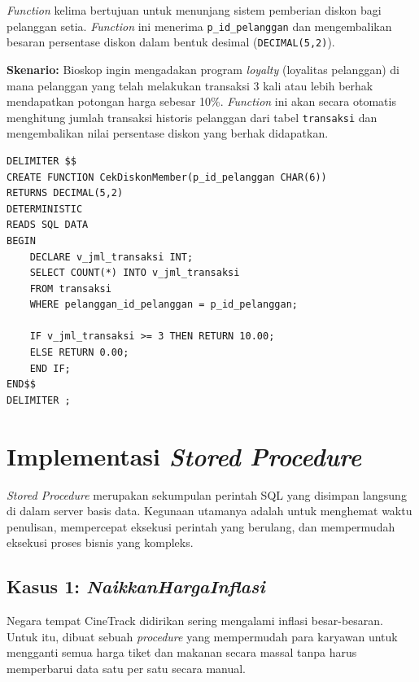 \documentclass[letter,12pt,bahasa]{article}
\begin{document}
\textit{Function} kelima bertujuan untuk menunjang sistem pemberian diskon bagi pelanggan setia. \textit{Function} ini menerima \texttt{p\_id\_pelanggan} dan mengembalikan besaran persentase diskon dalam bentuk desimal (\texttt{DECIMAL(5,2)}).

\textbf{Skenario:} Bioskop ingin mengadakan program \textit{loyalty} (loyalitas pelanggan) di mana pelanggan yang telah melakukan transaksi 3 kali atau lebih berhak mendapatkan potongan harga sebesar 10\%. \textit{Function} ini akan secara otomatis menghitung jumlah transaksi historis pelanggan dari tabel \texttt{transaksi} dan mengembalikan nilai persentase diskon yang berhak didapatkan.

\begin{lstlisting}[style=sql, caption={\textit{Function} 5 --- \texttt{CekDiskonMember}}, label={lst:func5}]
DELIMITER $$
CREATE FUNCTION CekDiskonMember(p_id_pelanggan CHAR(6))
RETURNS DECIMAL(5,2)
DETERMINISTIC
READS SQL DATA
BEGIN
    DECLARE v_jml_transaksi INT;
    SELECT COUNT(*) INTO v_jml_transaksi
    FROM transaksi
    WHERE pelanggan_id_pelanggan = p_id_pelanggan;
    
    IF v_jml_transaksi >= 3 THEN RETURN 10.00;
    ELSE RETURN 0.00;
    END IF;
END$$
DELIMITER ;
\end{lstlisting}

\clearpage

\section{Implementasi \textit{Stored Procedure}}

\textit{Stored Procedure} merupakan sekumpulan perintah SQL yang disimpan langsung di dalam server basis data. Kegunaan utamanya adalah untuk menghemat waktu penulisan, mempercepat eksekusi perintah yang berulang, dan mempermudah eksekusi proses bisnis yang kompleks.

\subsection{Kasus 1: \textit{NaikkanHargaInflasi}}
Negara tempat CineTrack didirikan sering mengalami inflasi besar-besaran. Untuk itu, dibuat sebuah \textit{procedure} yang mempermudah para karyawan untuk mengganti semua harga tiket dan makanan secara massal tanpa harus memperbarui data satu per satu secara manual.
\end{document}
